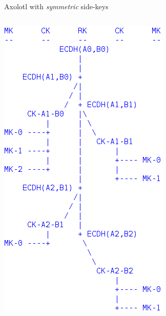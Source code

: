 \documentclass[fleqn,xcolor={usenames,dvipsnames}]{beamer}
\begin{document}
\begin{frame}{Axolotl with {\em symmetric} side-keys}
\begin{columns}[T]
\includegraphics[width=\textwidth]{../pics/axolotl_diagram}
\end{columns}
\end{frame}
\end{document}
